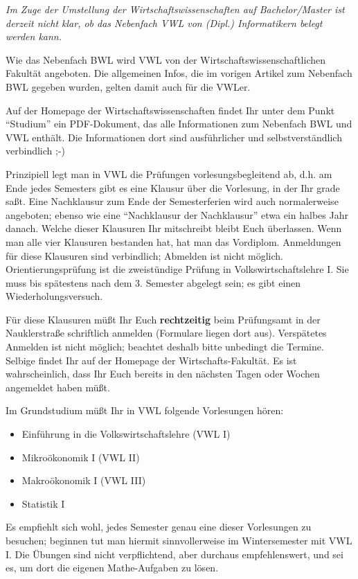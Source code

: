 \nebenfachveraltet
\emph{Im Zuge der Umstellung der Wirtschaftswissenschaften auf Bachelor/Master
ist derzeit nicht klar, ob das Nebenfach VWL von (Dipl.) Informatikern belegt werden kann.}\par\bigskip

Wie das Nebenfach BWL wird VWL von der Wirtschaftswissenschaftlichen
Fakultät angeboten. Die allgemeinen Infos, die im vorigen Artikel zum
Nebenfach BWL gegeben wurden, gelten damit auch für die VWLer.

Auf der Homepage der Wirtschaftswissenschaften findet Ihr unter dem Punkt
"`Studium"' ein PDF-Dokument, das alle Informationen zum Nebenfach BWL und
VWL enthält. Die Informationen dort sind ausführlicher und selbstverständlich
verbindlich ;-)

Prinzipiell legt man in VWL die Prüfungen vorlesungsbegleitend ab, d.h.
am Ende jedes Semesters gibt es eine Klausur über die Vorlesung, in der
Ihr grade saßt. Eine Nachklausur zum Ende der Semesterferien wird auch normalerweise
angeboten; ebenso wie eine "`Nachklausur der Nachklausur"' etwa ein halbes Jahr danach. Welche
dieser Klausuren Ihr mitschreibt bleibt Euch überlassen. Wenn man alle vier Klausuren
bestanden hat, hat man das Vordiplom. Anmeldungen für diese Klausuren sind verbindlich; Abmelden ist nicht möglich.
Orientierungsprüfung ist die zweistündige Prüfung in Volkswirtschaftslehre I.
Sie muss bis spätestens nach dem 3. Semester abgelegt sein; es gibt einen Wiederholungsversuch.

Für diese Klausuren müßt Ihr Euch \textbf{rechtzeitig} beim Prüfungsamt
in der Nauklerstraße schriftlich anmelden (Formulare liegen dort aus). Verspätetes
Anmelden ist nicht möglich; beachtet deshalb bitte unbedingt die Termine. Selbige
findet Ihr auf der Homepage der Wirtschafts-Fakultät. Es ist wahrscheinlich, dass
Ihr Euch bereits in den nächsten Tagen oder Wochen angemeldet haben müßt.

Im Grundstudium müßt Ihr in VWL folgende Vorlesungen hören:

\begin{itemize}
\item Einführung in die Volkswirtschaftslehre (VWL I)
\item Mikroökonomik I (VWL II)
\item Makroökonomik I (VWL III)
\item Statistik I
\end{itemize}

Es empfiehlt sich wohl, jedes Semester genau eine dieser Vorlesungen zu besuchen;
beginnen tut man hiermit sinnvollerweise im Wintersemester mit VWL I. Die
Übungen sind nicht verpflichtend, aber durchaus empfehlenswert, und sei es,
um dort die eigenen Mathe-Aufgaben zu lösen.

